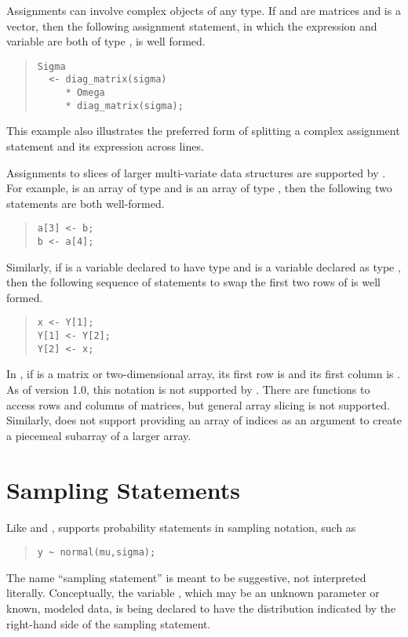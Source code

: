 Assignments can involve complex objects of any type.  If 
and  are matrices and  is a vector, then the
following assignment statement, in which the expression and variable
are both of type , is well formed.
%
\begin{quote}
\begin{Verbatim}
Sigma
  <- diag_matrix(sigma)
     * Omega 
     * diag_matrix(sigma);
\end{Verbatim}
\end{quote}
%
This example also illustrates the preferred form of splitting a
complex assignment statement and its expression across lines.

Assignments to slices of larger multi-variate data structures are
supported by \Stan.  For example,  is an array of type
 and  is an array of type , then
the following two statements are both well-formed.
%
\begin{quote}
\begin{Verbatim}
a[3] <- b;
b <- a[4];
\end{Verbatim}
\end{quote}
%
Similarly, if  is a variable declared to have type
 and  is a variable declared as type
, then the following sequence of statements to swap the
first two rows of  is well formed.
%
\begin{quote}
\begin{Verbatim}
x <- Y[1];
Y[1] <- Y[2];
Y[2] <- x;
\end{Verbatim}
\end{quote}
%

In \R, if  is a matrix or two-dimensional array, its first row
is  and its first column is .  As of version
1.0, this notation is not supported by \Stan.  There are functions to
access rows and columns of matrices, but general array slicing is not
supported.  Similarly,  does not support providing an array of
indices as an argument to create a piecemeal subarray of a larger
array.


\section{Sampling Statements}

Like \BUGS and \JAGS, \Stan supports probability statements in
sampling notation, such as
%
\begin{quote}
\begin{Verbatim}
y ~ normal(mu,sigma);
\end{Verbatim}
\end{quote}
%
The name ``sampling statement'' is meant to be suggestive, not
interpreted literally.  Conceptually, the variable , which may
be an unknown parameter or known, modeled data, is being declared
to have the distribution indicated by the right-hand side of the
sampling statement.

